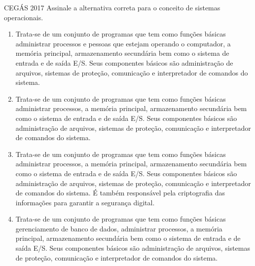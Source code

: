 \documentclass[aspectratio=169,
				xcolor=table]{beamer}
\begin{document}
	\begin{frame}{CEGÁS 2017 }
		Assinale a alternativa correta para o conceito de sistemas operacionais. 
		\begin{enumerate}[a]
			
			\small
			\item Trata-se de um conjunto de programas que tem como funções básicas administrar processos e pessoas que estejam operando o computador, a memória principal, armazenamento secundária bem como o sistema de entrada e de saída E/S. Seus componentes básicos são administração de arquivos, sistemas de proteção, comunicação e interpretador de comandos do sistema. 
			\item Trata-se de um conjunto de programas que tem como funções básicas administrar processos, a memória principal, armazenamento secundária bem como o sistema de entrada e de saída E/S. Seus componentes básicos são administração de arquivos, sistemas de proteção, comunicação e interpretador de comandos do sistema. 
			\item Trata-se de um conjunto de programas que tem como funções básicas administrar processos, a memória principal, armazenamento secundária bem como o sistema de entrada e de saída E/S. Seus componentes básicos são administração de arquivos, sistemas de proteção, comunicação e interpretador de comandos do sistema. É também responsável pela criptografia das informações para garantir a segurança digital. 
			\item Trata-se de um conjunto de programas que tem como funções básicas gerenciamento de banco de dados, administrar processos, a memória principal, armazenamento secundária bem como o sistema de entrada e de saída E/S. Seus componentes básicos são administração de arquivos, sistemas de proteção, comunicação e interpretador de comandos do sistema.

		\end{enumerate}
	\end{frame}
\end{document}
